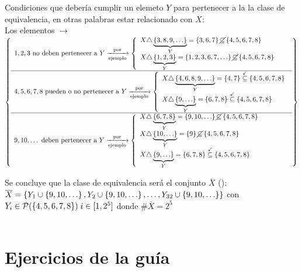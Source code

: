 \documentclass[12pt,a4paper, spanish]{article}
\begin{document}
Condiciones que debería cumplir un elemeto $Y$ para pertenecer a la la clase de equivalencia, en otras palabras estar relacionado con $X$:\\
Los elementos $\to$\\
$\llaves{l}{
		1, 2, 3 \text{ no deben pertenecer a } Y \flecha{por}[ejemplo]
		\llave{l}{
			X \triangle \underbrace{\set{3,8,9,\dots}}_Y = \set{3,6,7} \cancel{\subseteq} \set{4,5,6,7,8}\\
			X \triangle \underbrace{\set{1,2,3}}_Y = \set{1,2,3,6,7,\dots} \cancel{\subseteq} \set{4,5,6,7,8}\\
		}\\ \hline

		4,5,6,7,8 \text{ pueden o no pertenecer a } Y \flecha{por}[ejemplo]
		\llave{l}{
			X \triangle \underbrace{\set{4,6,8,9,\dots}}_Y = \set{4,7} \stackrel{\checkmark}\subseteq \set{4,5,6,7,8}\\
			X \triangle \underbrace{\set{9,\dots}}_Y = \set{6,7,8} \stackrel{\checkmark}\subseteq \set{4,5,6,7,8}
		}\\ \hline

		9,10, \dots \text{ deben pertenecer a } Y \flecha{por}[ejemplo]
		\llave{l}{
			X \triangle \underbrace{\set{6,7,8}}_Y = \set{9,10,\dots} \cancel\subseteq \set{4,5,6,7,8}\\
			X \triangle \underbrace{\set{10,\dots}}_Y = \set{9} \cancel\subseteq \set{4,5,6,7,8}\\
			X \triangle \underbrace{\set{9,\dots}}_Y = \set{6,7,8} \stackrel{\checkmark}\subseteq \set{4,5,6,7,8}
		}
	}$

Se concluye que la clase de equivalencia será el conjunto $\overline{X}$ ():\\
$\overline{X} = \set{ Y_1  \union \set{9,10,\dots}, Y_2  \union \set{9,10,\dots}, \dots, Y_{32}  \union \set{9,10,\dots}}$
con
$Y_i \in \mathcal P(\left\{ 4,5,6,7,8 \right\})\; i \in [1,2^5] $ donde $\#\overline{X} = 2^5$\\

\noindent{}\\


\section*{Ejercicios de la guía}

\ejercicio

\ejercicio
\ejercicio
\ejercicio
\ejercicio
\ejercicio
\ejercicio
\ejercicio
\end{document}
